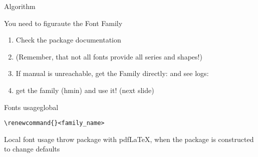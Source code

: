 \begin{frame}[fragile]{Algorithm\magicPage}\relax

You need to figuraute the {\csk Font Family}
\begin{enumerate}
     \item Check the package documentation
     \item (Remember, that not all fonts provide all series and shapes!)
     \item If manual is unreachable, get the Family directly: \ccol{\showthe}\ccol{\font} and see {\csk logs}:
\end{enumerate}


\begin{enumerate}
    \setcounter{enumi}{3}
    \item get the family ({\csk hmin}) and use it! (next slide)
     
\end{enumerate}
\end{frame}

\begin{frame}[t, fragile]{Fonts usage\magicPage}{global}\relax

\relax

\verb|\renewcommand{|\ccol{\rmdefault}\verb|}<family_name>|

\end{frame}

\begin{frame}
\magicPage
     \centering\huge Local font usage throw package with pdf\LaTeX, when the package is constructed to change defaults
     
\end{frame}

